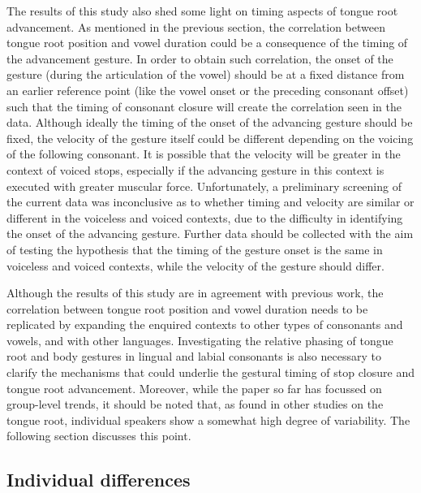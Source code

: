 \documentclass[preprint]{JASAnew}
\begin{document}
The results of this study also shed some light on timing aspects of
tongue root advancement. As mentioned in the previous section, the
correlation between tongue root position and vowel duration could be a
consequence of the timing of the advancement gesture. In order to obtain
such correlation, the onset of the gesture (during the articulation of
the vowel) should be at a fixed distance from an earlier reference point
(like the vowel onset or the preceding consonant offset) such that the
timing of consonant closure will create the correlation seen in the
data. Although ideally the timing of the onset of the advancing gesture
should be fixed, the velocity of the gesture itself could be different
depending on the voicing of the following consonant. It is possible that
the velocity will be greater in the context of voiced stops, especially
if the advancing gesture in this context is executed with greater
muscular force. Unfortunately, a preliminary screening of the current
data was inconclusive as to whether timing and velocity are similar or
different in the voiceless and voiced contexts, due to the difficulty in
identifying the onset of the advancing gesture. Further data should be
collected with the aim of testing the hypothesis that the timing of the
gesture onset is the same in voiceless and voiced contexts, while the
velocity of the gesture should differ.

Although the results of this study are in agreement with previous work,
the correlation between tongue root position and vowel duration needs to
be replicated by expanding the enquired contexts to other types of
consonants and vowels, and with other languages. Investigating the
relative phasing of tongue root and body gestures in lingual and labial
consonants is also necessary to clarify the mechanisms that could
underlie the gestural timing of stop closure and tongue root
advancement. Moreover, while the paper so far has focussed on
group-level trends, it should be noted that, as found in other studies
on the tongue root, individual speakers show a somewhat high degree of
variability. The following section discusses this point.

\hypertarget{individual-differences}{%
\subsection{Individual differences}\label{individual-differences}}

\label{s:idio}
\end{document}
